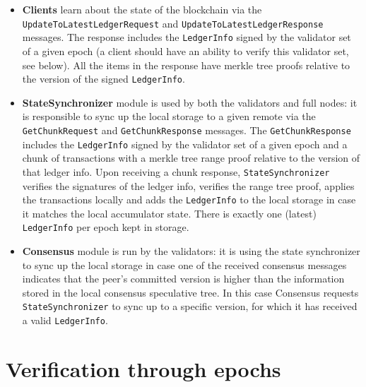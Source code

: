 \documentclass[letterpaper,10pt]{article}
\begin{document}
\begin{itemize}
\item \textbf{Clients} learn about the state of the blockchain via the \texttt{UpdateToLatestLedgerRequest} and \texttt{UpdateToLatestLedgerResponse} messages. The response includes the \texttt{LedgerInfo} signed by the validator set of a given epoch (a client should have an ability to verify this validator set, see below). All the items in the response have merkle tree proofs relative to the version of the signed \texttt{LedgerInfo}.
\item \textbf{StateSynchronizer} module is used by both the validators and full nodes: it is responsible to sync up the local storage to a given remote via the \texttt{GetChunkRequest} and \texttt{GetChunkResponse} messages. The \texttt{GetChunkResponse} includes the \texttt{LedgerInfo} signed by the validator set of a given epoch and a chunk of transactions with a merkle tree range proof relative to the version of that ledger info. Upon receiving a chunk response, \texttt{StateSynchronizer} verifies the signatures of the ledger info, verifies the range tree proof, applies the transactions locally and adds the \texttt{LedgerInfo} to the local storage in case it matches the local accumulator state. There is exactly one (latest) \texttt{LedgerInfo} per epoch kept in storage.
\item \textbf{Consensus} module is run by the validators: it is using the state synchronizer to sync up the local storage in case one of the received consensus messages indicates that the peer's committed version is higher than the information stored in the local consensus speculative tree. In this case Consensus requests \texttt{StateSynchronizer} to sync up to a specific version, for which it has received a valid \texttt{LedgerInfo}.
\end{itemize}

\section{Verification through epochs}
\label{verification-epochs}
\end{document}
